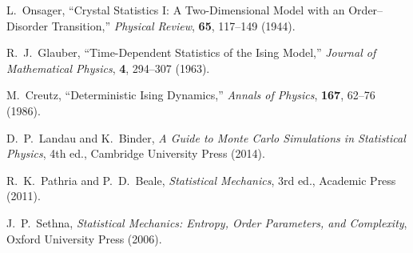 \documentclass[11pt,a4paper]{article}
\begin{document}
\begin{enumerate}[leftmargin=2em, label={[\arabic*]}]
  \item L.~Onsager, ``Crystal Statistics I: A Two-Dimensional Model with an
    Order--Disorder Transition,'' \textit{Physical Review}, \textbf{65},
    117--149 (1944).

  \item R.~J.~Glauber, ``Time-Dependent Statistics of the Ising Model,''
    \textit{Journal of Mathematical Physics}, \textbf{4}, 294--307 (1963).

  \item M.~Creutz, ``Deterministic Ising Dynamics,''
    \textit{Annals of Physics}, \textbf{167}, 62--76 (1986).

  \item D.~P.~Landau and K.~Binder, \textit{A Guide to Monte Carlo Simulations
    in Statistical Physics}, 4th ed., Cambridge University Press (2014).

  \item R.~K.~Pathria and P.~D.~Beale, \textit{Statistical Mechanics},
    3rd ed., Academic Press (2011).

  \item J.~P.~Sethna, \textit{Statistical Mechanics: Entropy, Order Parameters,
    and Complexity}, Oxford University Press (2006).
\end{enumerate}
\end{document}

